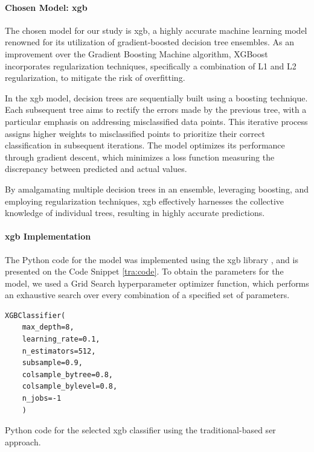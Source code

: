 \paragraph{Chosen Model: \acl{xgb}}

The chosen model for our study is \ac{xgb}, a highly accurate machine learning model renowned for its utilization of gradient-boosted decision tree ensembles. As an improvement over the Gradient Boosting Machine algorithm, XGBoost incorporates regularization techniques, specifically a combination of L1 and L2 regularization, to mitigate the risk of overfitting.

In the \ac{xgb} model, decision trees are sequentially built using a boosting technique. Each subsequent tree aims to rectify the errors made by the previous tree, with a particular emphasis on addressing misclassified data points. This iterative process assigns higher weights to misclassified points to prioritize their correct classification in subsequent iterations. The model optimizes its performance through gradient descent, which minimizes a loss function measuring the discrepancy between predicted and actual values.

By amalgamating multiple decision trees in an ensemble, leveraging boosting, and employing regularization techniques, \ac{xgb} effectively harnesses the collective knowledge of individual trees, resulting in highly accurate predictions.

\paragraph{\acl{xgb} Implementation}

The Python code for the model was implemented using the \ac{xgb} library \cite{xgboostchen}, and is presented on the Code Snippet \ref{tra:code}. To obtain the parameters for the model, we used a Grid Search hyperparameter optimizer function, which performs an exhaustive search over every combination of a specified set of parameters.

\begin{listing}[H]
	\begin{verbatim}
XGBClassifier(
	max_depth=8,
	learning_rate=0.1,
	n_estimators=512,
	subsample=0.9,
	colsample_bytree=0.8,
	colsample_bylevel=0.8,
	n_jobs=-1
	)
	\end{verbatim}
	\caption{Python code for the selected \ac{xgb} classifier using the traditional-based \ac{ser} approach.}
	\label{tra:code}
\end{listing}


